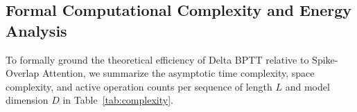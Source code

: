 \documentclass[10pt,a4paper,twoside]{article}
\begin{document}
\subsection{Formal Computational Complexity and Energy Analysis}
To formally ground the theoretical efficiency of Delta BPTT relative to Spike-Overlap Attention, we summarize the asymptotic time complexity, space complexity, and active operation counts per sequence of length $L$ and model dimension $D$ in Table~\ref{tab:complexity}.

\begin{table}[t!]
\begin{center}
{\caption{Theoretical complexity and operation count comparison per sequence of length $L$ and model dimension $D$. $s \in [0,1]$ denotes the forward spike sparsity ($s \approx 0.67$). Energy is computed using 45\,nm CMOS proxies ($E_{\text{MAC}} = 4.6$\,pJ, $E_{\text{AC}} = 0.9$\,pJ).}\label{tab:complexity}}


\end{center}
\end{table}
\end{document}
